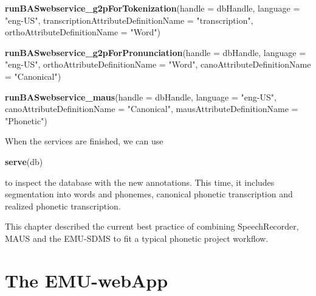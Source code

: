 \documentclass[]{book}
\newenvironment{Shaded}{\begin{snugshade}}{\end{snugshade}}
\newcommand{\KeywordTok}[1]{\textcolor[rgb]{0.13,0.29,0.53}{\textbf{{#1}}}}
\newcommand{\DataTypeTok}[1]{\textcolor[rgb]{0.13,0.29,0.53}{{#1}}}
\newcommand{\StringTok}[1]{\textcolor[rgb]{0.31,0.60,0.02}{{#1}}}
\newcommand{\NormalTok}[1]{{#1}}
\theoremstyle{definition}
\theoremstyle{definition}
\theoremstyle{definition}
\theoremstyle{remark}
\begin{document}
\begin{Shaded}
\begin{Highlighting}[]
\KeywordTok{runBASwebservice_g2pForTokenization}\NormalTok{(}\DataTypeTok{handle =} \NormalTok{dbHandle,}
                                    \DataTypeTok{language =} \StringTok{"eng-US"}\NormalTok{,}
                                    \DataTypeTok{transcriptionAttributeDefinitionName =} \StringTok{"transcription"}\NormalTok{,}
                                    \DataTypeTok{orthoAttributeDefinitionName =} \StringTok{"Word"}\NormalTok{)}

\KeywordTok{runBASwebservice_g2pForPronunciation}\NormalTok{(}\DataTypeTok{handle =} \NormalTok{dbHandle,}
                                     \DataTypeTok{language =} \StringTok{"eng-US"}\NormalTok{,}
                                     \DataTypeTok{orthoAttributeDefinitionName =} \StringTok{"Word"}\NormalTok{,}
                                     \DataTypeTok{canoAttributeDefinitionName =} \StringTok{"Canonical"}\NormalTok{)}

\KeywordTok{runBASwebservice_maus}\NormalTok{(}\DataTypeTok{handle =} \NormalTok{dbHandle,}
                      \DataTypeTok{language =} \StringTok{"eng-US"}\NormalTok{,}
                      \DataTypeTok{canoAttributeDefinitionName =} \StringTok{"Canonical"}\NormalTok{,}
                      \DataTypeTok{mausAttributeDefinitionName =} \StringTok{"Phonetic"}\NormalTok{)}
\end{Highlighting}
\end{Shaded}

When the services are finished, we can use

\begin{Shaded}
\begin{Highlighting}[]
\KeywordTok{serve}\NormalTok{(db)}
\end{Highlighting}
\end{Shaded}

to inspect the database with the new annotations. This time, it includes
segmentation into words and phonemes, canonical phonetic transcription
and realized phonetic transcription.

This chapter described the current best practice of combining
SpeechRecorder, MAUS and the EMU-SDMS to fit a typical phonetic project
workflow.

\chapter{The EMU-webApp}\label{the-emu-webapp}
\end{document}
